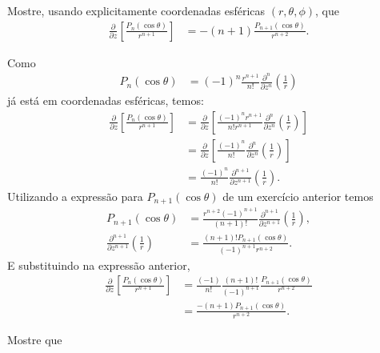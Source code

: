 \documentclass[a4paper,12pt, leqno, answers]{exam}
\begin{document}
\begin{questions}
    \question Mostre, usando explicitamente coordenadas esf\'{e}ricas $(r, \theta, \phi)$, que
    \begin{align*}
        \frac{\partial}{\partial z} \left[ \frac{P_n(\cos \theta)}{r^{n + 1}} \right] &= - (n + 1) \frac{P_{n + 1}(\cos \theta)}{r^{n + 2}}.
    \end{align*}
    \begin{solution}
        Como
        \begin{align*}
            P_n(\cos \theta) &= (-1)^n \frac{r^{n + 1}}{n!} \frac{\partial^n}{\partial z^n}\left( \frac{1}{r} \right)
        \end{align*}
        j\'{a} est\'{a} em coordenadas esf\'{e}ricas, temos:
        \begin{align*}
            \frac{\partial}{\partial z}\left[ \frac{P_n(\cos \theta)}{r^{n + 1}} \right] &= \frac{\partial}{\partial z}\left[ \frac{(-1)^n r^{n + 1}}{n! r^{n + 1}} \frac{\partial^n}{\partial z^n}\left( \frac{1}{r} \right) \right] \\
            &= \frac{\partial}{\partial z}\left[ \frac{(-1)^n}{n!} \frac{\partial^n}{\partial z^n}\left( \frac{1}{r} \right) \right] \\
            &= \frac{(-1)^n}{n!} \frac{\partial^{n + 1}}{\partial z^{n + 1}}\left( \frac{1}{r} \right). 
        \end{align*}
        Utilizando a express\~{a}o para $P_{n + 1}(\cos \theta)$ de um exerc\'{i}cio anterior temos
        \begin{align*}
            P_{n + 1}(\cos \theta) &= \frac{r^{n + 2} (-1)^{n + 1}}{(n + 1)!} \frac{\partial^{n + 1}}{\partial z^{n + 1}}\left( \frac{1}{r} \right), \\
            \frac{\partial^{n + 1}}{\partial z^{n + 1}}\left( \frac{1}{r} \right) &= \frac{(n + 1)! P_{n + 1}(\cos \theta)}{(-1)^{n + 1} r^{n + 2}}.
        \end{align*}
        E substituindo na express\~{a}o anterior,
        \begin{align*}
            \frac{\partial}{\partial z}\left[ \frac{P_n(\cos \theta)}{r^{n + 1}} \right] &= \frac{(-1)}{n!} \frac{(n + 1)!}{(-1)^{n + 1}} \frac{P_{n + 1}(\cos \theta)}{r^{n + 2}} \\
            &= \frac{-(n + 1) P_{n + 1}(\cos \theta)}{r^{n + 2}}.
        \end{align*}
    \end{solution}

    \question Mostre que
    \begin{parts}

\end{parts}
\end{questions}
\end{document}
